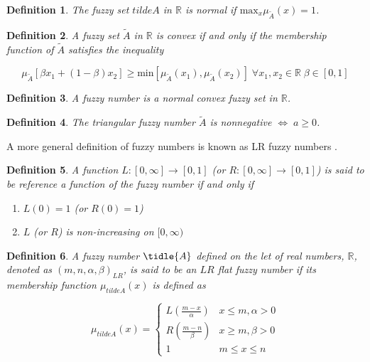 \documentclass[11pt,a4paper,final]{article}
\newtheorem{definition}{Definition}[section]
\begin{document}
\begin{definition}
The fuzzy set \(tilde{A}\) in \(\mathbb{R}\) is normal if \(\text{max}_x \mu_{\tilde{A}}(x) = 1\).
\end{definition}

\begin{definition}
A fuzzy set \(\tilde{A}\) in \(\mathbb{R}\) is convex if and only if the membership function of \(\tilde{A}\) satisfies the inequality

\begin{equation*}
\mu_{\tilde{A}}[\beta x_1 + (1-\beta)x_2] \ge \text{min}[\mu_{\tilde{A}}(x_1), \mu_{\tilde{A}}(x_2)]\; \forall x_1, x_2 \in \mathbb{R}\; \beta \in [0,1]
\end{equation*}
\end{definition}

\begin{definition}
A fuzzy number is a normal convex fuzzy set in \(\mathbb{R}\).
\end{definition}

\begin{definition}
The triangular fuzzy number \(\tilde{A}\) is nonnegative \(\iff\; a \ge 0\).
\end{definition}

A more general definition of fuzzy numbers is known as LR fuzzy numbers
\cite{kaur-2016-introd-fuzzy,zimmermann-2001-fuzzy-set}.

\begin{definition}
A function \(L:[0,\infty] \rightarrow [0,1]\) (or \(R:[0,\infty] \rightarrow [0,1]\)) is said to be reference a function of the fuzzy number if and only
if

\begin{enumerate}
\item \(L(0) = 1\) (or \(R(0) = 1\))
\item \(L\) (or \(R\)) is non-increasing on \([0,\infty)\)
\end{enumerate}
\end{definition}

\begin{definition}
A fuzzy number \(\tidle{A}\) defined on the let of real numbers, \(\mathbb{R}\), denoted as \((m,n,\alpha,\beta)_{LR}\), is said to be an \(LR\)
flat fuzzy number if its membership function \(\mu_{tilde{A}}(x)\) is defined as

\begin{equation}
\mu_{tilde{A}}(x) =
\begin{cases}
L(\frac{m-x}{\alpha}) & x \le m, \alpha > 0 \\
R(\frac{m-n}{\beta}) & x \ge m, \beta > 0 \\
1                & m \le x \le n
\end{cases}
\end{equation}
\end{definition}
\end{document}
